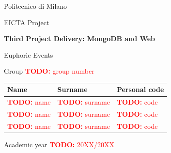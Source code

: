 \documentclass[11pt,a4paper]{report}
\newcommand{\todo}[1]{\textcolor{red}{\textbf{TODO:} #1}}
\begin{document}
\begin{titlepage}
  \centering
  {\Large Politecnico di Milano\par}
  \vspace{0.5cm}
  {\large EICTA \textendash{} Project\par}
  \vspace{2.5cm}
  {\Huge\bfseries Third Project Delivery: MongoDB and Web\par}
  \vspace{0.6cm}
  {\Large Euphoric Events\par}
  \vspace{2cm}
  {\large Group \todo{group number}\par}
  \vspace{1cm}
  \begin{tabular}{lll}
    \toprule
    Name & Surname & Personal code \\
    \midrule
    \todo{name} & \todo{surname} & \todo{code} \\
    \todo{name} & \todo{surname} & \todo{code} \\
    \todo{name} & \todo{surname} & \todo{code} \\
    \bottomrule
  \end{tabular}
  \vfill
  {\large Academic year \todo{20XX/20XX}\par}
\end{titlepage}

\tableofcontents





\end{document}
